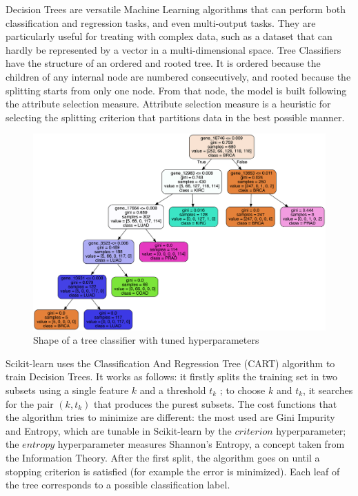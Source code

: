 \documentclass[12pt]{article}
\begin{document}
Decision Trees are versatile Machine Learning algorithms that can perform both classification and regression tasks, and even multi-output tasks. They are particularly useful for treating with complex data, such as a dataset that can hardly be represented by a vector in a multi-dimensional space.
Tree Classifiers have the structure of an ordered and rooted tree. It is ordered because the children of any internal node are numbered consecutively, and rooted because the splitting starts from only one node.
From that node, the model is built following the attribute selection measure.
Attribute selection measure is a heuristic for selecting the splitting criterion that partitions data in the best possible manner.


\begin{figure}[h!]
\centering
\includegraphics[width=\linewidth]{img/tree_best.png}
\caption{Shape of a tree classifier with tuned hyperparameters}
\label{fig1}
\end{figure}


Scikit-learn uses the Classification And Regression Tree (CART) algorithm to train Decision Trees. It works as follows: it firstly splits the training set in two subsets using a single feature $k$ and a threshold $t_k$ ; to choose $k$ and $t_k$, it searches for the pair $(k, t_k)$ that produces the purest subsets. The cost functions that the algorithm tries to minimize are different: the most used are Gini Impurity and Entropy, which are tunable in Scikit-learn by the $criterion$ hyperparameter; the $entropy$ hyperparameter measures Shannon's Entropy, a concept taken from the Information Theory. After the first split, the algorithm goes on until a stopping criterion is satisfied (for example the error is minimized). Each leaf of the tree corresponds to a possible classification label.
\end{document}
